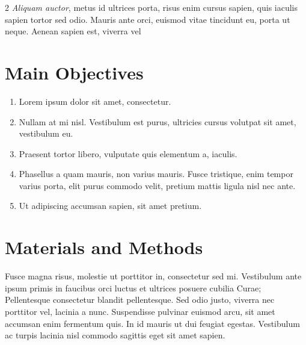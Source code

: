 \documentclass[a0,portrait]{a0poster}
\begin{document}
\begin{multicols}{2}
\textit{Aliquam auctor}, metus id ultrices porta, risus enim cursus sapien, quis iaculis sapien tortor sed odio. Mauris ante orci, euismod vitae tincidunt eu, porta ut neque. Aenean sapien est, viverra vel 


\color{DarkSlateGray} %

\section*{Main Objectives}

\begin{enumerate}
\item Lorem ipsum dolor sit amet, consectetur.
\item Nullam at mi nisl. Vestibulum est purus, ultricies cursus volutpat sit amet, vestibulum eu.
\item Praesent tortor libero, vulputate quis elementum a, iaculis.
\item Phasellus a quam mauris, non varius mauris. Fusce tristique, enim tempor varius porta, elit purus commodo velit, pretium mattis ligula nisl nec ante.
\item Ut adipiscing accumsan sapien, sit amet pretium.
\end{enumerate}


\section*{Materials and Methods}

Fusce magna risus, molestie ut porttitor in, consectetur sed mi. Vestibulum ante ipsum primis in faucibus orci luctus et ultrices posuere cubilia Curae; Pellentesque consectetur blandit pellentesque. Sed odio justo, viverra nec porttitor vel, lacinia a nunc. Suspendisse pulvinar euismod arcu, sit amet accumsan enim fermentum quis. In id mauris ut dui feugiat egestas. Vestibulum ac turpis lacinia nisl commodo sagittis eget sit amet sapien.



\end{multicols}
\end{document}
